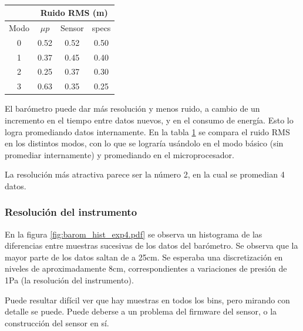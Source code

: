 \documentclass[main]{subfiles}
\begin{document}
\begin{table}
\vspace{-40pt}
\centering
\begin{tabular}{c|c|c|c|} 
\cline{2-4}
	& \multicolumn{3}{|c|}{\cellcolor[gray]{0.8} Ruido RMS  (m)}      \\ \hline
\multicolumn{1}{|c|}{\cellcolor[gray]{0.8} {Modo}} & \cellcolor[gray]{0.8} {$\mu p$} &\cellcolor[gray]{0.8} {Sensor} &\cellcolor[gray]{0.8} {specs}\\ \hline

\multicolumn{1}{|c|}{0}	&	0.52	&	0.52	&	0.50\\
\hline
\multicolumn{1}{|c|}{1}	&	0.37	&	0.45	&	0.40\\
\hline
\multicolumn{1}{|c|}{2}	&	0.25	&	0.37	&	0.30\\
\hline
\multicolumn{1}{|c|}{3}	&	0.63	&	0.35	&	0.25\\
\hline

\end{tabular}
\caption{}
\vspace{-16pt}
\label{tab:ruido-rms}
\end{table}

El barómetro puede dar más resolución y menos ruido, a cambio de un incremento en el tiempo entre datos nuevos, y en el consumo de energía. Esto lo logra promediando datos internamente. En la tabla \ref{tab:ruido-rms} se compara el ruido RMS en los distintos modos, con lo que se lograría usándolo en el modo básico (sin promediar internamente) y promediando en el microprocesador.

La resolución más atractiva parece ser la número 2, en la cual se promedian 4 datos.

\subsubsection{Resolución del instrumento}

En la figura \ref{fig:barom_hist_exp4.pdf} se observa un histograma de las diferencias entre muestras sucesivas de los datos del barómetro. Se observa que la mayor parte de los datos saltan de a 25cm. Se esperaba una discretización en niveles de  aproximadamente 8cm, correspondientes a variaciones de presión de 1Pa (la resolución del instrumento).

Puede resultar difícil ver que hay muestras en todos los bins, pero mirando con detalle se puede. Puede deberse a un problema del firmware del sensor, o la construcción del sensor en sí.
\end{document}
